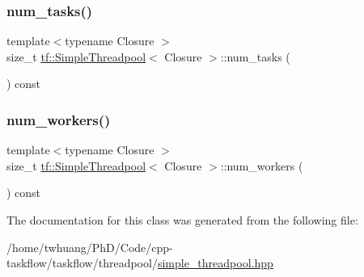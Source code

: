 \mbox{\label{classtf_1_1SimpleThreadpool_aed771a0ae0de0f30d143b122645acd46}} 
\subsubsection{\texorpdfstring{num\+\_\+tasks()}{num\_tasks()}}
{\footnotesize\ttfamily template$<$typename Closure $>$ \\
size\+\_\+t \hyperlink{classtf_1_1SimpleThreadpool}{tf\+::\+Simple\+Threadpool}$<$ Closure $>$\+::num\+\_\+tasks (\begin{DoxyParamCaption}{ }\end{DoxyParamCaption}) const}

\mbox{\label{classtf_1_1SimpleThreadpool_a4fec0216bb89a6ed2a9e59f2b1a4f01a}} 
\subsubsection{\texorpdfstring{num\+\_\+workers()}{num\_workers()}}
{\footnotesize\ttfamily template$<$typename Closure $>$ \\
size\+\_\+t \hyperlink{classtf_1_1SimpleThreadpool}{tf\+::\+Simple\+Threadpool}$<$ Closure $>$\+::num\+\_\+workers (\begin{DoxyParamCaption}{ }\end{DoxyParamCaption}) const}



The documentation for this class was generated from the following file\+:\begin{DoxyCompactItemize}
\item 
/home/twhuang/\+Ph\+D/\+Code/cpp-\/taskflow/taskflow/threadpool/\hyperlink{simple__threadpool_8hpp}{simple\+\_\+threadpool.\+hpp}\end{DoxyCompactItemize}
